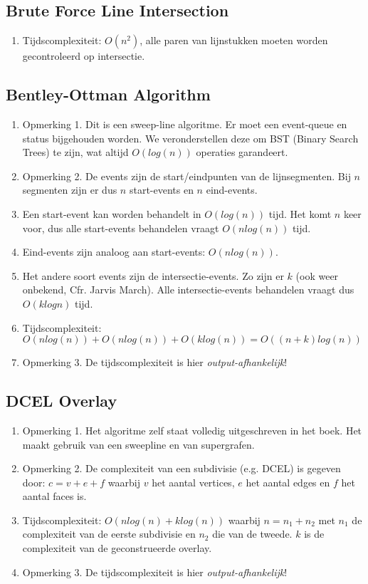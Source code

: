 \documentclass[12pt,a4paper]{article}
\begin{document}
		\subsection{Brute Force Line Intersection}
			\begin{enumerate}
				\item Tijdscomplexiteit: $O(n^2)$, alle paren van lijnstukken moeten worden gecontroleerd op intersectie.
			\end{enumerate}
		
		\subsection{Bentley-Ottman Algorithm}
			\begin{enumerate}
				\item Opmerking 1. Dit is een sweep-line algoritme. Er moet een event-queue en status bijgehouden worden. We veronderstellen deze om BST (Binary Search Trees) te zijn, wat altijd $O(log (n))$ operaties garandeert.
				\item Opmerking 2. De events zijn de start/eindpunten van de lijnsegmenten. Bij $n$ segmenten zijn er dus $n$ start-events en $n$ eind-events.
				\item Een start-event kan worden behandelt in $O(log (n))$ tijd. Het komt $n$ keer voor, dus alle start-events behandelen vraagt $O(n log (n))$ tijd.
				\item Eind-events zijn analoog aan start-events: $O(n log (n))$. 
				\item Het andere soort events zijn de intersectie-events. Zo zijn er $k$ (ook weer onbekend, Cfr. Jarvis March). Alle intersectie-events behandelen vraagt dus $O(k log n)$ tijd.
				\item Tijdscomplexiteit: $O(n log (n)) + O(n log (n)) + O(k log (n)) = O((n + k) log (n))$ 
				\item Opmerking 3. De tijdscomplexiteit is hier \emph{output-afhankelijk}!
			\end{enumerate}
		
		\subsection{DCEL Overlay}
			\begin{enumerate}
				\item Opmerking 1. Het algoritme zelf staat volledig uitgeschreven in het boek. Het maakt gebruik van een sweepline en van supergrafen. 
				\item Opmerking 2. De complexiteit van een subdivisie (e.g. DCEL) is gegeven door: $c = v + e + f$ waarbij $v$ het aantal vertices, $e$ het aantal edges en $f$ het aantal faces is. 
				\item Tijdscomplexiteit: $O(n log (n) + k log (n))$ waarbij $n = n_1 + n_2$ met $n_1$ de complexiteit van de eerste subdivisie en $n_2$ die van de tweede. $k$ is de complexiteit van de geconstrueerde overlay.
				\item Opmerking 3. De tijdscomplexiteit is hier \emph{output-afhankelijk}!
			\end{enumerate}     
\end{document}
